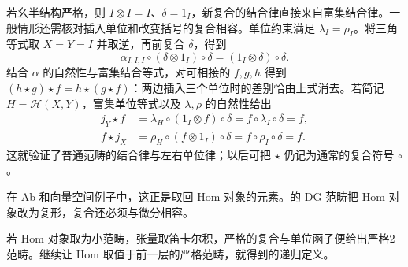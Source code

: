 若幺半结构严格，则 \(I\otimes I=I\)、\(\delta=1_I\)，新复合的结合律直接来自富集结合律。一般情形还需核对插入单位和改变括号的复合相容。单位约束满足 \(\lambda_I=\rho_I\)\cite[Corollary 2.2.5, p. 24]{EtingofEtAl2015TensorCategories}。将三角等式取 \(X=Y=I\) 并取逆，再前复合 \(\delta\)，得到
\[
	\alpha_{I,I,I}\circ(\delta\otimes1_I)\circ\delta =(1_I\otimes\delta)\circ\delta.
\]
结合 \(\alpha\) 的自然性与富集结合等式，对可相接的 \(f,g,h\) 得到 \((h\star g)\star f=h\star(g\star f)\)：两边插入三个单位时的差别恰由上式消去。若简记 \(H=\mathcal H(X,Y)\)，富集单位等式以及 \(\lambda,\rho\) 的自然性给出
\[
	\begin{aligned}
		j_Y\star f&=\lambda_H\circ(1_I\otimes f)\circ\delta =f\circ\lambda_I\circ\delta=f,\\
		f\star j_X&=\rho_H\circ(f\otimes1_I)\circ\delta =f\circ\rho_I\circ\delta=f.
	\end{aligned}
\]
这就验证了普通范畴的结合律与左右单位律；以后可把 \(\star\) 仍记为通常的复合符号 \(\circ\)。

\ProseParagraphBreak

在 Ab 和向量空间例子中，这正是取回 Hom 对象的元素。的 DG 范畴把 Hom 对象改为复形，复合还必须与微分相容。

\ProseParagraphBreak
若 Hom 对象取为小范畴，张量取笛卡尔积，严格的复合与单位函子便给出严格2范畴。继续让 Hom 取值于前一层的严格范畴，就得到的递归定义。
